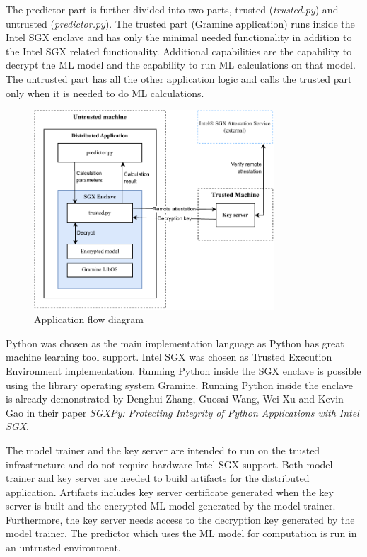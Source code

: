 The predictor part is further divided into two parts, trusted (\textit{trusted.py}) and untrusted (\textit{predictor.py}). The trusted part (Gramine application) runs inside the Intel SGX enclave and has only the minimal needed functionality in addition to the Intel SGX related functionality. Additional capabilities are the capability to decrypt the ML model and the capability to run ML calculations on that model. The untrusted part has all the other application logic and calls the trusted part only when it is needed to do ML calculations.

\begin{figure}
\centering \includegraphics[width=0.8\textwidth]{img/sgx}
\caption{Application flow diagram}
\label{fig:sgx-flow}
\end{figure}

 Python was chosen as the main implementation language as Python has great machine learning tool support. Intel SGX was chosen as Trusted Execution Environment implementation. Running Python inside the SGX enclave is possible using the library operating system Gramine.\cite{gramine} Running Python inside the enclave is already demonstrated by Denghui Zhang, Guosai Wang, Wei Xu and Kevin Gao in their paper \textit{SGXPy: Protecting Integrity of Python Applications with Intel SGX}\cite{sgxpy}.

The model trainer and the key server are intended to run on the trusted infrastructure and do not require hardware Intel SGX support. Both model trainer and key server are needed to build artifacts for the distributed application. Artifacts includes key server certificate generated when the key server is built and the encrypted ML model generated by the model trainer. Furthermore, the key server needs access to the decryption key generated by the model trainer. The predictor which uses the ML model for computation is run in an untrusted environment. 

